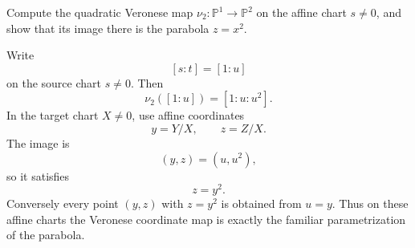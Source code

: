 \begin{problem}\label{prob:vi36-08}
Compute the quadratic Veronese map \(\nu_2:\mathbb P^1\to\mathbb P^2\) on the affine chart \(s\ne0\), and show that its image there is the parabola \(z=x^2\).
\end{problem}

\ifdefined\FullProblemDossiers
\begin{solution}
Write
\[
[s:t]=[1:u]
\]
on the source chart \(s\neq0\). Then
\[
\nu_2([1:u])
=
[1:u:u^2].
\]
In the target chart \(X\neq0\), use affine coordinates
\[
y=Y/X,
\qquad
z=Z/X.
\]
The image is
\[
(y,z)=(u,u^2),
\]
so it satisfies
\[
\boxed{z=y^2}.
\]
Conversely every point \((y,z)\) with \(z=y^2\) is obtained from \(u=y\). Thus on these affine charts the
Veronese coordinate map is exactly the familiar parametrization of the parabola.
\end{solution}
\fi
